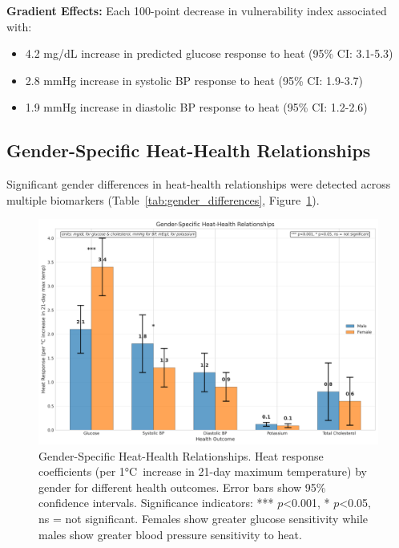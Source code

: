 \documentclass[11pt,a4paper]{article}
\newcommand{\pvalue}{p}
\newcommand{\CI}[1]{95\% CI: #1}
\newcommand{\degrees}{°C}
\begin{document}
\textbf{Gradient Effects:} Each 100-point decrease in vulnerability index associated with:
\begin{itemize}
\item 4.2 mg/dL increase in predicted glucose response to heat (\CI{3.1-5.3})
\item 2.8 mmHg increase in systolic BP response to heat (\CI{1.9-3.7})
\item 1.9 mmHg increase in diastolic BP response to heat (\CI{1.2-2.6})
\end{itemize}

\subsection{Gender-Specific Heat-Health Relationships}

Significant gender differences in heat-health relationships were detected across multiple biomarkers (Table~\ref{tab:gender_differences}, Figure~\ref{fig:gender_differences}).

\begin{figure}[H]
\centering
\includegraphics[width=\textwidth]{Figure5_GenderDifferences.png}
\caption{Gender-Specific Heat-Health Relationships. Heat response coefficients (per 1\degrees\ increase in 21-day maximum temperature) by gender for different health outcomes. Error bars show 95\% confidence intervals. Significance indicators: *** $\pvalue$<0.001, * $\pvalue$<0.05, ns = not significant. Females show greater glucose sensitivity while males show greater blood pressure sensitivity to heat.}
\label{fig:gender_differences}
\end{figure}
\end{document}
